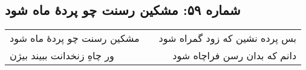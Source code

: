 \begin{center}
\section*{شماره ۵۹: مشکین رسنت چو پردۀ ماه شود}
\label{sec:059}
\begin{longtable}{l p{0.5cm} r}
مشکین رسنت چو پردهٔ ماه شود
&&
بس پرده نشین که زود گمراه شود
\\
ور چاهِ زنخدانت ببیند بیژن
&&
دانم که بدان رسن فراچاه شود
\\
\end{longtable}
\end{center}
